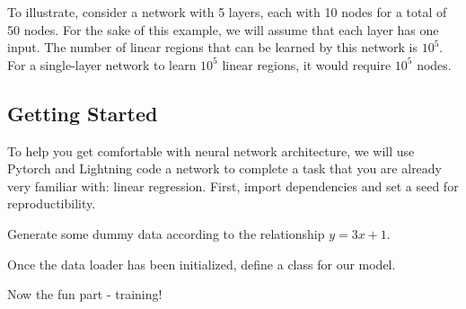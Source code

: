 \documentclass{article}
\begin{document}
To illustrate, consider a network with 5 layers, each with 10 nodes for a total of 50 nodes. For the sake of this example, we will assume that each layer has one input. The number of linear regions that can be learned by this network is \(10^5\). For a single-layer network to learn \(10^5\) linear regions, it would require \(10^5\) nodes. 

\subsection{Getting Started}

To help you get comfortable with neural network architecture, we will use Pytorch and Lightning code a network to complete a task that you are already very familiar with: linear regression. First, import dependencies and set a seed for reproductibility.



Generate some dummy data according to the relationship \(y = 3x + 1\).



Once the data loader has been initialized, define a class for our model.



Now the fun part - training!


\end{document}
